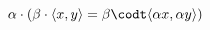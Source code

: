 \documentclass[preview]{standalone}
\begin{document}
\begin{center}
$\alpha \cdot (\beta \cdot \langle x, y \rangle = \beta \codt \langle \alpha x, \alpha y \rangle)$
\end{center}
\end{document}
